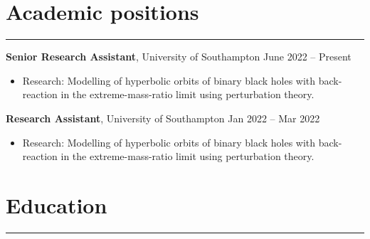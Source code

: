 \documentclass[10.5pt, oneside]{article}   	%
\begin{document}
 
 
\begin{center}
\huge
\href{mailto:O.F.Long@soton.ac.uk}{} \:
\textcolor{Orcidcolour}{\href{https://orcid.org/0000-0002-3897-9272}{}} \:
\textcolor{RGcolour}{\href{https://www.researchgate.net/profile/Oliver-Long-3}{}} \:
\textcolor{LIcolour}{\href{https://www.linkedin.com/in/oliverflong/}{}} \:
\href{https://scholar.google.com/citations?user=92pSUO0AAAAJ&hl=en}{} \:
\href{https://oliverlong.info}{}
\end{center}

 \vspace{1mm}


{\color{Sectioncolour}
\section*{Academic positions}
\vspace{-3mm}
\noindent\rule{\linewidth}{0.6pt}}

\textbf{Senior Research Assistant}, University of Southampton \hfill June 2022 -- Present \\
\vspace{-5mm}
\begin{itemize}
\item Research: Modelling of hyperbolic orbits of binary black holes with back-reaction in the extreme-mass-ratio limit using perturbation theory. 
\end{itemize}

\textbf{Research Assistant}, University of Southampton \hfill Jan 2022 -- Mar 2022 \\
\vspace{-5mm}
\begin{itemize}
\item Research: Modelling of hyperbolic orbits of binary black holes with back-reaction in the extreme-mass-ratio limit using perturbation theory. 
\end{itemize}

{\color{Sectioncolour}
\section*{Education}
\vspace{-3mm}
\noindent\rule{\linewidth}{0.6pt}}
\end{document}
